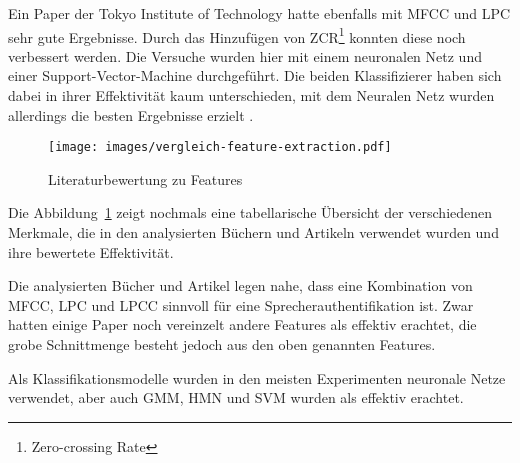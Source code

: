Ein Paper der Tokyo Institute of Technology hatte ebenfalls mit \ac{MFCC} und \ac{LPC} sehr gute Ergebnisse.
Durch das Hinzufügen von ZCR\footnote{Zero-crossing Rate} konnten diese noch verbessert werden.
Die Versuche wurden hier mit einem neuronalen Netz und einer Support-Vector-Machine durchgeführt.
Die beiden Klassifizierer haben sich dabei in ihrer Effektivität kaum unterschieden, mit dem Neuralen Netz wurden allerdings die besten Ergebnisse erzielt \autocite[vgl.][S. 4]{neha_chauhan_2019_2019}.
\begin{landscape}
    \centering 
    \begin{figure}[H]
        \centering
        \texttt{[image: images/vergleich-feature-extraction.pdf]}
        \caption{Literaturbewertung zu Features}
        \label{fig:vergleichFeatureExtraction}
    \end{figure}
\end{landscape}

Die Abbildung~\ref{fig:vergleichFeatureExtraction} zeigt nochmals eine tabellarische Übersicht der verschiedenen Merkmale, die in den analysierten Büchern und Artikeln verwendet wurden und ihre bewertete Effektivität.

Die analysierten Bücher und Artikel legen nahe, dass eine Kombination von \ac{MFCC}, \ac{LPC} und \ac{LPCC} sinnvoll für eine Sprecherauthentifikation ist.
Zwar hatten einige Paper noch vereinzelt andere Features als effektiv erachtet, die grobe Schnittmenge besteht jedoch aus den oben genannten Features.

Als Klassifikationsmodelle wurden in den meisten Experimenten neuronale Netze verwendet, aber auch GMM, HMN und SVM wurden als effektiv erachtet.